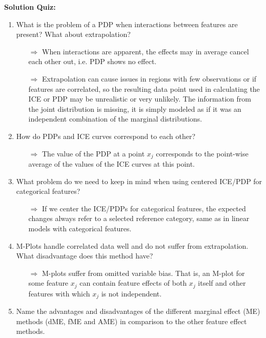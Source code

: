 \textbf{Solution Quiz:}\\\noindent
\medskip

\begin{enumerate}
    \item What is the problem of a PDP when interactions between features are present? What about extrapolation?
    \begin{itemize}
        \item[$\Rightarrow$] When interactions are apparent, the effects may in average cancel each other out, i.e. PDP shows no effect.
        \item[$\Rightarrow$] Extrapolation can cause issues in regions with few observations or if features are correlated, so the resulting data point used in calculating the ICE or PDP may be unrealistic or very unlikely.
        The information from the joint distribution is missing, it is simply modeled as if it was an independent combination of the marginal distributions.
    \end{itemize}
    \item How do PDPs and ICE curves correspond to each other?
    \begin{itemize}
        \item[$\Rightarrow$] The value of the PDP at a point $x_j$ corresponds to the point-wise average of the values of the ICE curves at this point.
    \end{itemize}
    \item What problem do we need to keep in mind when using centered ICE/PDP for categorical features? 
    \begin{itemize}
        \item[$\Rightarrow$] If we center the ICE/PDPs for categorical features, the expected changes always refer to a selected reference category, same as in linear models with categorical features.
    \end{itemize}
    \item M-Plots handle correlated data well and do not suffer from extrapolation. What disadvantage does this method have?
    \begin{itemize}
        \item[$\Rightarrow$] M-plots suffer from omitted variable bias.
        That is, an M-plot for some feature $x_j$ can contain feature effects of both $x_j$ itself and other features with which $x_j$ is not independent.
    \end{itemize}
    \item Name the advantages and disadvantages of the different marginal effect (ME) methods (dME, fME and AME) in comparison to the other feature effect methods.

\end{enumerate}
